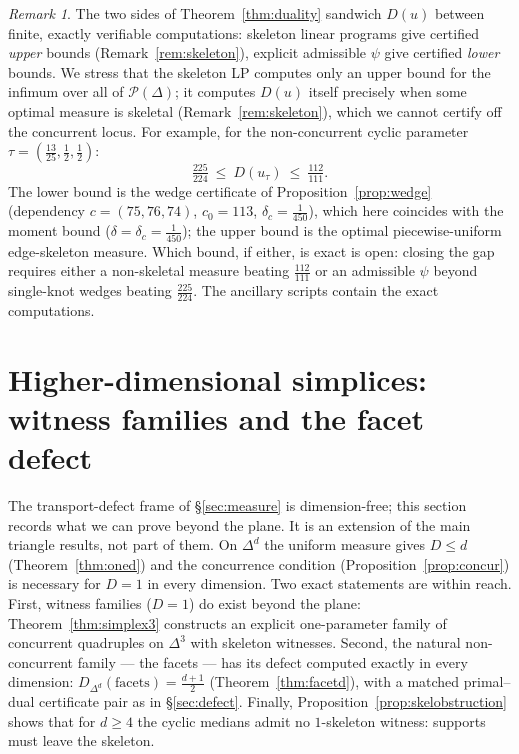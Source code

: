 \documentclass[11pt,reqno]{amsart}
\theoremstyle{plain}
\theoremstyle{definition}
\theoremstyle{remark}
\newtheorem{remark}[theorem]{Remark}
\begin{document}
\begin{remark}\label{rem:sandwich}
The two sides of Theorem~\ref{thm:duality} sandwich $D(u)$ between finite,
exactly verifiable computations: skeleton linear programs give certified
\emph{upper} bounds (Remark~\ref{rem:skeleton}), explicit admissible $\psi$
give certified \emph{lower} bounds. We stress that the skeleton LP computes
only an upper bound for the infimum over all of $\mathcal P(\Delta)$; it
computes $D(u)$ itself precisely when some optimal measure is skeletal
(Remark~\ref{rem:skeleton}), which we cannot certify off the concurrent
locus. For example, for the non-concurrent cyclic parameter
$\tau=(\tfrac{13}{25},\tfrac12,\tfrac12)$:
\[
\tfrac{225}{224}\ \le\ D(u_\tau)\ \le\ \tfrac{112}{111}.
\]
The lower bound is the wedge certificate of Proposition~\ref{prop:wedge}
(dependency $c=(75,76,74)$, $c_0=113$, $\delta_c=\tfrac1{450}$), which here
coincides with the moment bound ($\delta=\delta_c=\tfrac1{450}$); the upper
bound is the optimal piecewise-uniform edge-skeleton measure. Which bound, if
either, is exact is open: closing the gap requires either a non-skeletal
measure beating $\tfrac{112}{111}$ or an admissible $\psi$ beyond single-knot
wedges beating $\tfrac{225}{224}$. The ancillary scripts contain the exact
computations.
\end{remark}

\section{Higher-dimensional simplices: witness families and the facet
defect}\label{sec:simplex3}
The transport-defect frame of \S\ref{sec:measure} is dimension-free; this
section records what we can prove beyond the plane. It is an extension of the
main triangle results, not part of them. On $\Delta^d$ the uniform measure
gives $D\le d$ (Theorem~\ref{thm:oned}) and the concurrence condition
(Proposition~\ref{prop:concur}) is necessary for $D=1$ in every dimension.
Two exact statements are within reach. First, witness families ($D=1$) do
exist beyond the plane: Theorem~\ref{thm:simplex3} constructs an explicit
one-parameter family of concurrent quadruples on $\Delta^3$ with skeleton
witnesses. Second, the natural non-concurrent family --- the facets --- has
its defect computed exactly in every dimension:
$D_{\Delta^d}(\text{facets})=\tfrac{d+1}2$ (Theorem~\ref{thm:facetd}), with a
matched primal--dual certificate pair as in \S\ref{sec:defect}. Finally,
Proposition~\ref{prop:skelobstruction} shows that for $d\ge4$ the cyclic
medians admit no $1$-skeleton witness: supports must leave the skeleton.
\end{document}
